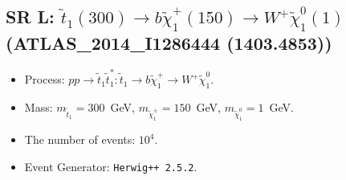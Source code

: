 \documentclass[12pt]{article}
\begin{document}
    
\subsection{SR L: $\tilde t_1(300) \to b \tilde \chi_1^+(150) \to W^+ \tilde \chi_1^0(1)$ (ATLAS\_2014\_I1286444 (1403.4853))} 


        \begin{itemize}
        \item  Process: $pp \to \tilde t_1 \tilde t_1^*: \tilde t_1 \to b \tilde \chi_1^+ \to W^+ \tilde \chi_1^0$.
        \item  Mass: $m_{\tilde t_1} = 300$~GeV, $m_{\tilde \chi_1^\pm} = 150$~GeV, $m_{\tilde \chi_1^0} = 1$~GeV.
        \item  The number of events: $10^4$.
        \item  Event Generator: {\tt Herwig++ 2.5.2}.    
        \end{itemize}    
    
\end{document}
